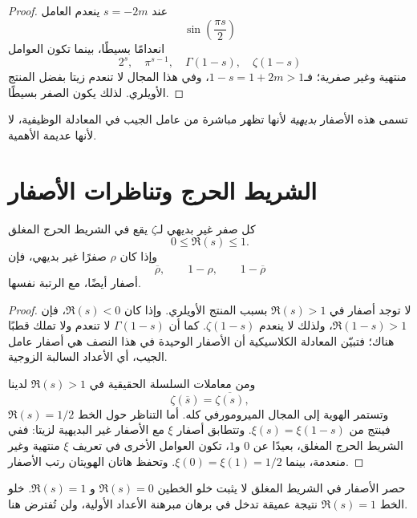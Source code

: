 \begin{proof}
عند \(s=-2m\) ينعدم العامل
\[
\sin\!\left(\frac{\pi s}{2}\right)
\]
انعدامًا بسيطًا، بينما تكون العوامل
\[
2^s,\quad \pi^{s-1},\quad \Gamma(1-s),\quad \zeta(1-s)
\]
منتهية وغير صفرية؛ فـ\(1-s=1+2m>1\)، وفي هذا المجال لا تنعدم زيتا
بفضل المنتج الأويلري. لذلك يكون الصفر بسيطًا.
\end{proof}

تسمى هذه الأصفار \emph{بديهية} لأنها تظهر مباشرة من عامل الجيب في
المعادلة الوظيفية، لا لأنها عديمة الأهمية.

\section{الشريط الحرج وتناظرات الأصفار}

\begin{proposition}
\label{prop:zeta-zero-symmetries-critical-strip}
\provedhere
كل صفر غير بديهي لـ\(\zeta\) يقع في الشريط الحرج المغلق
\[
0\leq\Re(s)\leq1.
\]
وإذا كان \(\rho\) صفرًا غير بديهي، فإن
\[
\overline{\rho},\qquad
1-\rho,\qquad
1-\overline{\rho}
\]
أصفار أيضًا، مع الرتبة نفسها.
\end{proposition}

\begin{proof}
لا توجد أصفار في \(\Re(s)>1\) بسبب المنتج الأويلري. وإذا كان
\(\Re(s)<0\)، فإن \(\Re(1-s)>1\)، ولذلك لا ينعدم
\(\zeta(1-s)\). كما أن \(\Gamma(1-s)\) لا تنعدم ولا تملك قطبًا
هناك؛ فتبيّن المعادلة الكلاسيكية أن الأصفار الوحيدة في هذا النصف هي
أصفار عامل الجيب، أي الأعداد السالبة الزوجية.

ومن معاملات السلسلة الحقيقية في \(\Re(s)>1\) لدينا
\[
\zeta(\overline{s})=\overline{\zeta(s)},
\]
وتستمر الهوية إلى المجال الميرومورفي كله. أما التناظر حول الخط
\(\Re(s)=1/2\) فينتج من \(\xi(s)=\xi(1-s)\). وتتطابق أصفار
\(\xi\) مع الأصفار غير البديهية لزيتا: ففي الشريط الحرج المغلق، بعيدًا
عن \(0\) و\(1\)، تكون العوامل الأخرى في تعريف \(\xi\) منتهية وغير
منعدمة، بينما \(\xi(0)=\xi(1)=1/2\). وتحفظ هاتان الهويتان رتب
الأصفار.
\end{proof}

\begin{remark}
حصر الأصفار في الشريط المغلق لا يثبت خلو الخطين \(\Re(s)=0\) و
\(\Re(s)=1\). خلو الخط \(\Re(s)=1\) نتيجة عميقة تدخل في برهان مبرهنة
الأعداد الأولية، ولن تُفترض هنا.
\end{remark}

